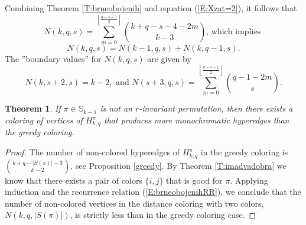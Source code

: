 \documentclass{birkjour}
\newtheorem{thm}{Theorem}[section]
\theoremstyle{definition}
\theoremstyle{remark}
\numberwithin{equation}{section}
\begin{document}
Combining Theorem \ref{T:brneobojenih} and equation
(\ref{E:Xzat=2}), it follows that
$$N(k,q,s)=\sum_{m=0}^{\left\lfloor\frac{q-s-1}{2}\right\rfloor}
{k+q-s-4-2m\choose k-3}\textrm{, which implies }$$
\begin{equation}\label{E:brneobojenihRR}
N(k,q,s)=N(k-1,q,s)+N(k,q-1,s).
\end{equation}
The ''boundary values'' for $N(k,q,s)$ are given by
$$N(k,s+2,s)= k-2, \textrm{ and }
N(s+3,q,s)=\sum_{m=0}^{\left\lfloor\frac{q-s-1}{2}\right\rfloor}
{q-1-2m\choose s} .$$
\begin{thm}  If
$\pi\in \mathbb{S}_{k-1}$ is not an $r$-invariant permutation,
then there exists a coloring of vertices of $H^{\pi}_{k,q}$ that
produces more monochromatic hyperedges than the greedy coloring.
\end{thm}
\begin{proof} The number of
non-colored hyperedges of $H^{\pi}_{k,q}$ in the greedy coloring
is ${k+q-|S(\pi)|-3\choose k-2}$, see Proposition \ref{greedy}. By
Theorem \ref{T:imadvadobra} we know that there exists a pair of
colors $\{i,j\}$ that is good for $\pi$. Applying induction and
the recurrence relation (\ref{E:brneobojenihRR}), we conclude that
the number of non-colored vertices in the distance coloring with
two colors, $N(k,q,|S(\pi)|)$, is strictly less than in the
greedy coloring case.
\end{proof}
\end{document}
